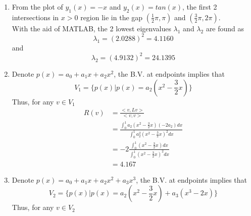 \documentclass[paper=a4, fontsize=11pt]{scrartcl} %
\numberwithin{equation}{section} %
\numberwithin{figure}{section} %
\numberwithin{table}{section} %
\begin{document}
\begin{enumerate}
\begin{proof}
				Thus 
				\begin{equation}
					sin(\sqrt{\lambda}) + \sqrt{\lambda}cos(\sqrt{\lambda}) = 0
				\end{equation}
				which indicates that the eigenvalue $\lambda$ satisfies 
				\begin{equation}
					\sqrt{\lambda} = - tan(\sqrt{\lambda})
				\end{equation}
			\end{proof}
		\item 
			From the plot of $y_1(x) = -x$ and $y_2(x) = tan(x)$, the first 2 intersections in $x>0$ region lie in the gap $(\frac{1}{2}\pi, \pi)$ and $(\frac{3}{2}\pi, 2\pi)$.\\
			With the aid of MATLAB, the 2 lowest eigenvalues $\lambda_1$ and $\lambda_2$ are found as
			\begin{equation}
				\lambda_1 = (2.0288)^2 = 4.1160
			\end{equation}
			and
			\begin{equation}
				\lambda_2 = (4.9132)^2 = 24.1395
			\end{equation}
		\item 
			Denote $p(x) = a_0 + a_1 x + a_2 x^2$, the B.V. at endpoints implies that  
			\begin{equation}
				V_1 = \Big\{ p(x) | p(x) =  a_2 (x^2 - \frac{3}{2}x)\Big\}
			\end{equation}
			Thus, for any $v \in V_1$
			\begin{equation}
				\begin{aligned}
					R(v) & = \frac{<v, Lv>}{<v, v>}\\
					     & = \frac{\int_{0}^{1} a_2 (x^2 - \frac{3}{2}x) (-2a_2) dx }{\int_{0}^{1} a_2^2 (x^2 - \frac{3}{2}x)^2 dx}\\
					     & = -2\frac{\int_{0}^{1} (x^2 - \frac{3}{2}x) dx }{\int_{0}^{1} (x^2 - \frac{3}{2}x)^2 dx}\\
					     & = 4.167
				\end{aligned}
			\end{equation}
		\item 
			Denote $p(x) = a_0 + a_1 x + a_2 x^2 + a_3 x^3$, the B.V. at endpoints implies that  
			\begin{equation}
				V_2 = \Big\{ p(x) | p(x) =  a_2 (x^2 - \frac{3}{2}x) + a_3 (x^3 - 2x)\Big\}
			\end{equation}
			Thus, for any $v \in V_2$
			\begin{equation}
				\begin{aligned}

\end{aligned}
\end{equation}
\end{enumerate}
\end{document}
